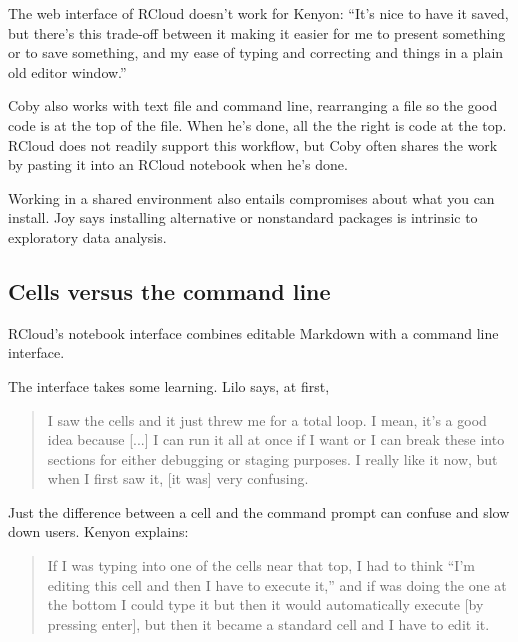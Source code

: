 The web interface of RCloud doesn't work for Kenyon: ``It's nice to have
it saved, but there's this trade-off between it making it easier for me to
present something or to save something, and my ease of typing and
correcting and things in a plain old editor window.''

Coby also works with text file and command line, rearranging a file so the
good code is at the top of the file. When he's done, all the the right is
code at the top. RCloud does not readily support this workflow, but Coby
often shares the work by pasting it into an RCloud notebook when he's done.


Working in a shared environment also entails compromises about what you can
install. Joy says installing alternative or nonstandard packages is
intrinsic to exploratory data analysis.

\subsection{Cells versus the command line}
RCloud's notebook interface combines editable Markdown with a command line
interface.

The interface takes some learning. Lilo says, at first,
\begin{quote}
I saw the cells and it just threw me
for a total loop. I mean, it's a good idea because [...] I can run it all at
once if I want or I can break these into sections for either debugging or
staging purposes. I really like it now, but when I first saw it, [it was] very
confusing.
\end{quote}

Just the difference between a cell and the command prompt can confuse and slow
down users. Kenyon explains:
\begin{quote}
If I was typing into one of the cells near that top, I had
to think ``I'm editing this cell and then I have to execute it,'' and if was doing
the one at the bottom I could type it but then it would automatically execute
[by pressing enter], but then it became a standard cell and I have to edit
it.
\end{quote}

